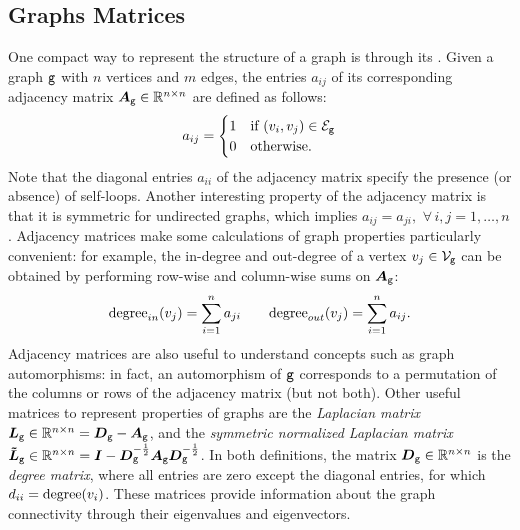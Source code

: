 \subsection{Graphs Matrices} \label{sec:adj-matrix}
One compact way to represent the structure of a graph is through its  . Given a graph $\mathtt{g}$ with $n$ vertices and $m$ edges, the entries $a_{ij}$ of its corresponding  adjacency matrix $\AdjMatrix{g} \in \Real^{n \times n}$ are defined as follows:
\[
a_{ij} =
    \begin{cases}
        1  & \text{if } (v_i, v_j) \in \Edges{g}\\
        0  & \text{otherwise.}
    \end{cases}
\]
Note that the diagonal entries $a_{ii}$ of the adjacency matrix specify the presence  (or absence) of self-loops. Another interesting property of the adjacency matrix is that  it is symmetric for undirected graphs, which implies $a_{ij} = a_{ji},$ $\forall\, i, j = 1, \ldots, n$. Adjacency matrices make some calculations of graph properties particularly convenient: for example, the in-degree and out-degree of a vertex $v_j \in \Nodes{g}$
can be obtained by performing row-wise and column-wise sums on $\AdjMatrix{g}$:
$$
\mathrm{degree}_{in}(v_j) = \sum_{i=1}^n a_{ji} \quad \quad \mathrm{degree}_{out}(v_j) = \sum_{i=1}^n a_{ij}.
$$
Adjacency matrices are also useful to understand concepts such as graph automorphisms: in fact, an automorphism of $\mathtt{g}$ corresponds to a permutation of the columns or rows of the adjacency matrix (but not both). Other useful matrices to represent properties of graphs are the \emph{Laplacian matrix} $\LaplacianMatrix{g} \in \Real^{n \times n} = \DegreeMatrix{g} - \AdjMatrix{g}$, and the \emph{symmetric normalized Laplacian matrix} $\NormLaplacianMatrix{g} \in \Real^{n \times n} = \Identity - \DegreeMatrix{g}^{-\frac{1}{2}}\AdjMatrix{g}\DegreeMatrix{g}^{-\frac{1}{2}}$. In both definitions, the matrix  $\DegreeMatrix{g} \in \Real^{n \times n}$ is the \emph{degree matrix}, where all entries are zero except the diagonal entries, for which $d_{ii} = \mathrm{degree}(v_i)$. These matrices provide information about the graph connectivity through their eigenvalues and eigenvectors.

